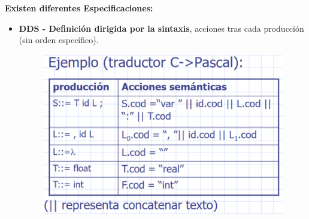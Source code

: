 \documentclass[12pt, twoside, openright]{report} %
\begin{document}
\textbf{Existen diferentes Especificaciones:}
\begin{itemize}
  \item \textbf{DDS - Definición dirigida por la sintaxis}, acciones tras cada producción (sin orden específico).
  
  \begin{figure}[H]
    {\includegraphics[scale=.3]{2021-04-21 10_49_57-05_resum_Sem_2021.pdf - Foxit Reader.png}}
  \end{figure}


\end{itemize}
\end{document}
